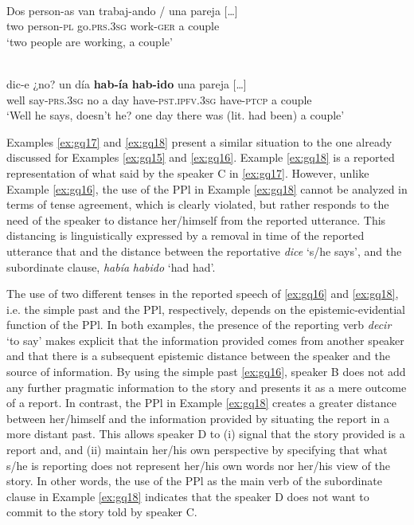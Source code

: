 \documentclass[output=paper]{langsci/langscibook}
\begin{document}
\ea \label{ex:gq17}
\\
	\gll Dos person-as van trabaj-ando / una pareja […]\\
	two person-\textsc{pl} go.\textsc{prs.3sg} work-\textsc{ger} {} a couple {}\\
	\glt ‘two people are working, a couple’
\z

\ea \label{ex:gq18}
\\
	 dic-e ¿no? un día \textbf{hab-ía} \textbf{hab-ido} una pareja […]\\
	well say-\textsc{prs.3sg} no a day have-\textsc{pst.ipfv.3sg} have-\textsc{ptcp} a couple {}\\
	\glt ‘Well he says, doesn’t he? one day there was (lit. had been) a couple’ 
\z

Examples \ref{ex:gq17} and \ref{ex:gq18} present a similar situation to the one already discussed for Examples \ref{ex:gq15} and \ref{ex:gq16}. Example \ref{ex:gq18} is a reported representation of what said by the speaker C in \ref{ex:gq17}. However, unlike Example \ref{ex:gq16}, the use of the PPl in Example \ref{ex:gq18} cannot be analyzed in terms of tense agreement, which is clearly violated, but rather responds to the need of the speaker to distance her/himself from the reported utterance. This distancing is linguistically expressed by a removal in time of the reported utterance that and the distance between the reportative \textit{dice} ‘s/he says’, and the subordinate clause, \textit{había} \textit{habido} ‘had had’.

The use of two different tenses in the reported speech of \ref{ex:gq16} and \ref{ex:gq18}, i.e. the simple past and the PPl, respectively, depends on the epistemic-evidential function of the PPl. In both examples, the presence of the reporting verb \textit{decir} ‘to say’ makes explicit that the information provided comes from another speaker and that there is a subsequent epistemic distance between the speaker and the source of information. By using the simple past \ref{ex:gq16}, speaker B does not add any further pragmatic information to the story and presents it as a mere outcome of a report. In contrast, the PPl in Example \ref{ex:gq18} creates a greater distance between her/himself and the information provided by situating the report in a more distant past. This allows speaker D to (i) signal that the story provided is a report and, and (ii) maintain her/his own perspective by specifying that what s/he is reporting does not represent her/his own words nor her/his view of the story. In other words, the use of the PPl as the main verb of the subordinate clause in Example \ref{ex:gq18} indicates that the speaker D does not want to commit to the story told by speaker C. 
\end{document}
